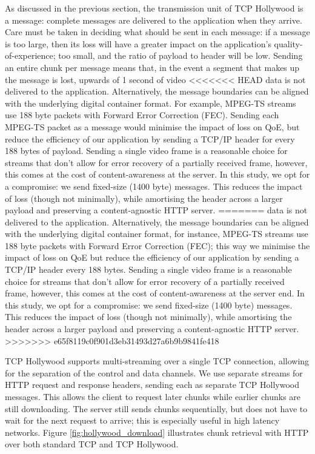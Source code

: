 As discussed in the previous section, the transmission unit of TCP Hollywood is a message:
complete messages are delivered to the application when they arrive. Care must be taken in
deciding what should be sent in each message: if a message is too large, then its loss
will have a greater impact on the application's quality-of-experience; too small, and the
ratio of payload to header will be low. Sending an entire chunk per message means that,
in the event a segment that makes up the message is lost, upwards of 1 second of video
<<<<<<< HEAD
data is not delivered to the application. Alternatively, the message boundaries can be aligned with the underlying digital container format. For example, MPEG-TS streams use 188 byte packets with Forward Error Correction (FEC). Sending each MPEG-TS packet as a message would minimise the impact of loss on QoE, but reduce the efficiency of our application by sending a TCP/IP header for every 188 bytes of payload. Sending a single video frame is a reasonable choice for streams that don't allow for error recovery of a partially received frame, however, this comes at the cost of content-awareness at the server. In this study, we opt for a compromise: we send fixed-size (1400 byte) messages. This reduces the impact of loss (though not minimally), while amortising the header across a larger payload and preserving a content-agnostic HTTP server.
=======
data is not delivered to the application. Alternatively, the message boundaries can be aligned with the underlying digital container format, for instance, MPEG-TS streams use 188 byte packets with Forward Error Correction (FEC); this way we minimise the impact of loss on QoE but reduce the efficiency of our application by sending a TCP/IP header every 188 bytes. Sending a single video frame is a reasonable choice for streams that don't allow for error recovery of a partially received frame, however, this comes at the cost of content-awareness at the server end. In this study, we opt for a compromise: we send fixed-size (1400 byte) messages. This reduces the impact of loss (though not minimally), while amortising the header across a larger payload and preserving a content-agnostic HTTP server.
>>>>>>> e65f8119c0f901d3eb31493d27a6b9b9841fe418

TCP Hollywood supports multi-streaming over a single TCP connection, allowing for the
separation of the control and data channels. We use separate streams for HTTP request and
response headers, sending each as separate TCP Hollywood messages. This allows the client
to request later chunks while earlier chunks are still downloading. The server still sends
chunks sequentially, but does not have to wait for the next request to arrive; this is
especially useful in high latency networks. Figure \ref{fig:hollywood_download}
illustrates chunk retrieval with HTTP over both standard TCP and TCP Hollywood.

